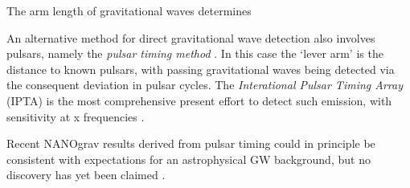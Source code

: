 The arm length of gravitational waves determines 

An alternative method for direct gravitational wave detection also involves pulsars, namely the \emph{pulsar timing method} . In this case the `lever arm' is the distance to known pulsars, with passing gravitational waves being detected via the consequent deviation in pulsar cycles. The \emph{Interational Pulsar Timing Array} (IPTA) is the most comprehensive present effort to detect such emission, with sensitivity at x frequencies .

Recent NANOgrav results derived from pulsar timing could in principle be consistent with expectations for an astrophysical GW background, but no discovery has yet been claimed .